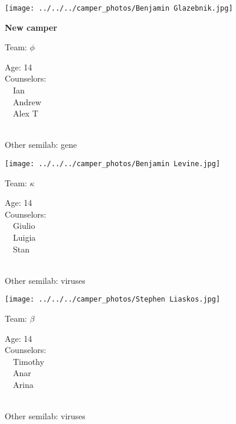\documentclass[10pt,letterpaper, landscape]{article}
\begin{document}
\horizontalshiftfornextsticker
\renewcommand{\baselinestretch}{1} \begin{sticker}
\noindent\begin{minipage}{0.5\textwidth}\texttt{[image: ../../../camper\_photos/Benjamin Glazebnik.jpg]}\end{minipage}\begin{minipage}{0.45\textwidth}
\textbf{New camper} 

Team: {\Large $\phi$}

Age:        14\\
Counselors: \\\ \ Ian\\\ \ Andrew\\\ \ Alex T\\
\end{minipage} \\ \vspace{0.07in}
Other semilab: gene
\end{sticker}
\horizontalshiftfornextsticker
\renewcommand{\baselinestretch}{1} \begin{sticker}
\noindent\begin{minipage}{0.5\textwidth}\texttt{[image: ../../../camper\_photos/Benjamin Levine.jpg]}\end{minipage}\begin{minipage}{0.45\textwidth}
Team: {\Large $\kappa$}

Age:        14\\
Counselors: \\\ \ Giulio\\\ \ Luigia\\\ \ Stan\\
\end{minipage} \\ \vspace{0.07in}
Other semilab: viruses
\end{sticker}
\horizontalshiftfornextsticker
\renewcommand{\baselinestretch}{1} \begin{sticker}
\noindent\begin{minipage}{0.5\textwidth}\texttt{[image: ../../../camper\_photos/Stephen Liaskos.jpg]}\end{minipage}\begin{minipage}{0.45\textwidth}
Team: {\Large $\beta$}

Age:        14\\
Counselors: \\\ \ Timothy\\\ \ Anar\\\ \ Arina\\
\end{minipage} \\ \vspace{0.07in}
Other semilab: viruses
\end{sticker}
\end{document}
